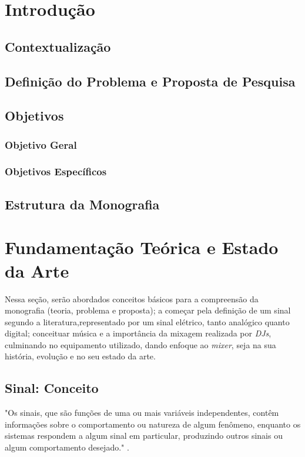 \chapter[Introdução]{Introdução}
\section{Contextualização}
\section{Definição do Problema e Proposta de Pesquisa}
\section{Objetivos}
\subsection{Objetivo Geral}
\subsection{Objetivos Específicos}
\section{\textbf{Estrutura da Monografia}}


\chapter[Fundamentação Teórica e Estado da Arte]{Fundamentação Teórica e Estado da Arte}

Nessa seção, serão abordados conceitos básicos para a compreensão da monografia (teoria, problema e proposta); a começar pela definição de um sinal segundo a literatura,representado por um sinal elétrico, tanto analógico quanto digital; conceituar música e a importância da mixagem realizada por \textit{DJs}, culminando no equipamento utilizado, dando enfoque ao \textit{mixer}, seja na sua história, evolução e no seu estado da arte.


\newpage
\section{Sinal: Conceito}

\begin{citacao}
"Os sinais, que são funções de uma ou mais variáveis independentes, contêm informações sobre o comportamento ou natureza de algum fenômeno, enquanto os sistemas respondem a algum sinal em particular, produzindo outros sinais ou algum comportamento desejado." \cite{oppenheim2010sinais}.
\end{citacao}

